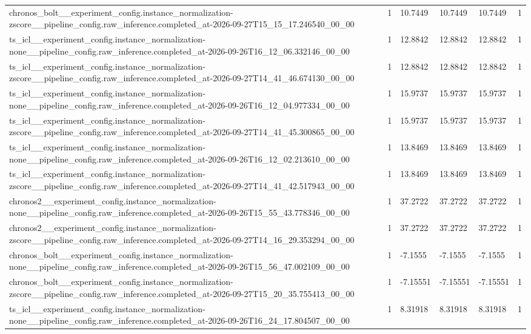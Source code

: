 \begin{tabular}{llllll}
chronos\_bolt\_\_experiment\_config.instance\_normalization-zscore\_\_pipeline\_config.raw\_inference.completed\_at-2026-09-27T15\_15\_17.246540\_00\_00 & 1 & 10.7449 & 10.7449 & 10.7449 & 1 \\
ts\_icl\_\_experiment\_config.instance\_normalization-none\_\_pipeline\_config.raw\_inference.completed\_at-2026-09-26T16\_12\_06.332146\_00\_00 & 1 & 12.8842 & 12.8842 & 12.8842 & 1 \\
ts\_icl\_\_experiment\_config.instance\_normalization-zscore\_\_pipeline\_config.raw\_inference.completed\_at-2026-09-27T14\_41\_46.674130\_00\_00 & 1 & 12.8842 & 12.8842 & 12.8842 & 1 \\
ts\_icl\_\_experiment\_config.instance\_normalization-none\_\_pipeline\_config.raw\_inference.completed\_at-2026-09-26T16\_12\_04.977334\_00\_00 & 1 & 15.9737 & 15.9737 & 15.9737 & 1 \\
ts\_icl\_\_experiment\_config.instance\_normalization-zscore\_\_pipeline\_config.raw\_inference.completed\_at-2026-09-27T14\_41\_45.300865\_00\_00 & 1 & 15.9737 & 15.9737 & 15.9737 & 1 \\
ts\_icl\_\_experiment\_config.instance\_normalization-none\_\_pipeline\_config.raw\_inference.completed\_at-2026-09-26T16\_12\_02.213610\_00\_00 & 1 & 13.8469 & 13.8469 & 13.8469 & 1 \\
ts\_icl\_\_experiment\_config.instance\_normalization-zscore\_\_pipeline\_config.raw\_inference.completed\_at-2026-09-27T14\_41\_42.517943\_00\_00 & 1 & 13.8469 & 13.8469 & 13.8469 & 1 \\
chronos2\_\_experiment\_config.instance\_normalization-none\_\_pipeline\_config.raw\_inference.completed\_at-2026-09-26T15\_55\_43.778346\_00\_00 & 1 & 37.2722 & 37.2722 & 37.2722 & 1 \\
chronos2\_\_experiment\_config.instance\_normalization-zscore\_\_pipeline\_config.raw\_inference.completed\_at-2026-09-27T14\_16\_29.353294\_00\_00 & 1 & 37.2722 & 37.2722 & 37.2722 & 1 \\
chronos\_bolt\_\_experiment\_config.instance\_normalization-none\_\_pipeline\_config.raw\_inference.completed\_at-2026-09-26T15\_56\_47.002109\_00\_00 & 1 & -7.1555 & -7.1555 & -7.1555 & 1 \\
chronos\_bolt\_\_experiment\_config.instance\_normalization-zscore\_\_pipeline\_config.raw\_inference.completed\_at-2026-09-27T15\_20\_35.755413\_00\_00 & 1 & -7.15551 & -7.15551 & -7.15551 & 1 \\
ts\_icl\_\_experiment\_config.instance\_normalization-none\_\_pipeline\_config.raw\_inference.completed\_at-2026-09-26T16\_24\_17.804507\_00\_00 & 1 & 8.31918 & 8.31918 & 8.31918 & 1 \\

\end{tabular}
